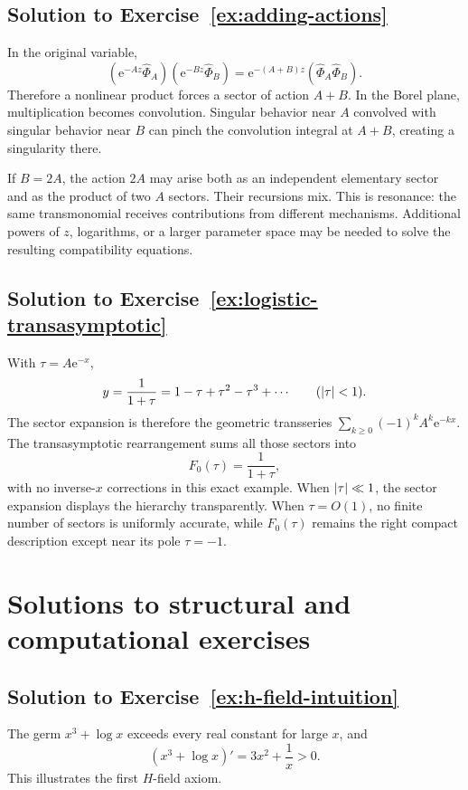 \documentclass[11pt,oneside]{book}
\theoremstyle{definition}
\theoremstyle{remark}
\newcommand{\e}{\mathrm{e}}
\newcommand{\phihat}{\widehat{\Phi}}
\DeclarePairedDelimiter{\abs}{\lvert}{\rvert}
\begin{document}
\subsection*{Solution to Exercise~\ref{ex:adding-actions}}

In the original variable,
\[
  \left(\e^{-Az}\phihat_A\right)
  \left(\e^{-Bz}\phihat_B\right)
  =\e^{-(A+B)z}(\phihat_A\phihat_B).
\]
Therefore a nonlinear product forces a sector of action $A+B$. In the Borel
plane, multiplication becomes convolution. Singular behavior near $A$ convolved
with singular behavior near $B$ can pinch the convolution integral at
$A+B$, creating a singularity there.

If $B=2A$, the action $2A$ may arise both as an independent elementary sector and
as the product of two $A$ sectors. Their recursions mix. This is resonance: the
same transmonomial receives contributions from different mechanisms. Additional
powers of $z$, logarithms, or a larger parameter space may be needed to solve the
resulting compatibility equations.

\subsection*{Solution to Exercise~\ref{ex:logistic-transasymptotic}}

With $\tau=A\e^{-x}$,
\[
  y=\frac1{1+\tau}
  =1-\tau+\tau^2-\tau^3+\cdots
  \qquad(\abs\tau<1).
\]
The sector expansion is therefore the geometric transseries
$\sum_{k\ge0}(-1)^kA^k\e^{-kx}$. The transasymptotic rearrangement sums all those
sectors into
\[
  F_0(\tau)=\frac1{1+\tau},
\]
with no inverse-$x$ corrections in this exact example. When $\abs\tau\ll1$, the
sector expansion displays the hierarchy transparently. When $\tau=O(1)$, no
finite number of sectors is uniformly accurate, while $F_0(\tau)$ remains the
right compact description except near its pole $\tau=-1$.

\section{Solutions to structural and computational exercises}

\subsection*{Solution to Exercise~\ref{ex:h-field-intuition}}

The germ $x^3+\log x$ exceeds every real constant for large $x$, and
\[
  (x^3+\log x)'=3x^2+\frac1x>0.
\]
This illustrates the first $H$-field axiom.
\end{document}
